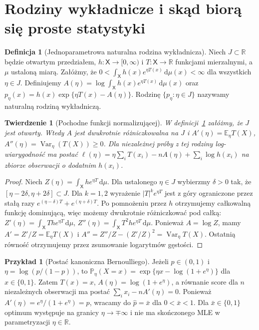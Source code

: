 \documentclass[11pt,a4paper,oneside]{report}
\numberwithin{equation}{chapter}
\theoremstyle{plain}
\newtheorem{twierdzenie}{Twierdzenie}[chapter]
\theoremstyle{definition}
\newtheorem{definicja}{Definicja}[chapter]
\newtheorem{przyklad}{Przykład}[chapter]
\theoremstyle{remark}
\newcommand{\R}{\mathbb R}
\newcommand{\Prob}{\mathbb P}
\newcommand{\E}{\mathbb E}
\newcommand{\Var}{\operatorname{Var}}
\newcommand{\dd}{\mathrm d}
\begin{document}
\section{Rodziny wykładnicze i skąd biorą się proste statystyki}
\begin{definicja}[Jednoparametrowa naturalna rodzina wykładnicza]\label{def:exp-family}
Niech $J\subset\R$ będzie otwartym przedziałem, $h:\mathsf X\to[0,\infty)$
i $T:\mathsf X\to\R$ funkcjami mierzalnymi, a $\mu$ ustaloną miarą.
Załóżmy, że
$0<\int_{\mathsf X}h(x)e^{\eta T(x)}\,\dd\mu(x)<\infty$ dla wszystkich $\eta\in J$.
Definiujemy
$A(\eta)=\log\int_{\mathsf X}h(x)e^{\eta T(x)}\,\dd\mu(x)$ oraz
$p_\eta(x)=h(x)\exp\{\eta T(x)-A(\eta)\}$.
Rodzinę $\{p_\eta:\eta\in J\}$ nazywamy naturalną rodziną wykładniczą.
\end{definicja}

\begin{twierdzenie}[Pochodne funkcji normalizującej]\label{thm:exp-family-moments}
W definicji~\ref{def:exp-family} załóżmy, że $J$ jest otwarty.
Wtedy $A$ jest dwukrotnie różniczkowalna na $J$ i
$A'(\eta)=\E_\eta T(X)$, $A''(\eta)=\Var_\eta(T(X))\ge0$.
Dla niezależnej próby z tej rodziny log-wiarygodność ma postać
$\ell(\eta)=\eta\sum_iT(x_i)-nA(\eta)+\sum_i\log h(x_i)$
na zbiorze obserwacji o dodatnim $h(x_i)$.
\end{twierdzenie}
\begin{proof}
Niech $Z(\eta)=\int_{\mathsf X}h e^{\eta T}\,\dd\mu$. Dla ustalonego
$\eta\in J$ wybierzmy $\delta>0$ tak, że
$[\eta-2\delta,\eta+2\delta]\subset J$. Dla $k=1,2$ wyrażenie
$|T|^k e^{\eta T}$ jest z góry ograniczone przez stałą razy
$e^{(\eta-\delta)T}+e^{(\eta+\delta)T}$.
Po pomnożeniu przez $h$ otrzymujemy całkowalną funkcję dominującą,
więc możemy dwukrotnie różniczkować pod całką:
$Z'(\eta)=\int_{\mathsf X}T h e^{\eta T}\,\dd\mu$,
$Z''(\eta)=\int_{\mathsf X}T^2 h e^{\eta T}\,\dd\mu$.
Ponieważ $A=\log Z$, mamy $A'=Z'/Z=\E_\eta T(X)$ i
$A''=Z''/Z-(Z'/Z)^2=\Var_\eta T(X)$.
Ostatnią równość otrzymujemy przez zsumowanie logarytmów gęstości.
\end{proof}

\begin{przyklad}[Postać kanoniczna Bernoulliego]
Jeżeli $p\in(0,1)$ i $\eta=\log(p/(1-p))$, to
$\Prob_\eta(X=x)=\exp\{\eta x-\log(1+e^\eta)\}$ dla $x\in\{0,1\}$.
Zatem $T(x)=x$, $A(\eta)=\log(1+e^\eta)$, a równanie score dla
$n$ niezależnych obserwacji ma postać
$\sum_i x_i-nA'(\eta)=0$. Ponieważ
$A'(\eta)=e^\eta/(1+e^\eta)=p$, wracamy do
$\widehat p=\bar x$ dla $0<\bar x<1$.
Dla $\bar x\in\{0,1\}$ optimum występuje na granicy
$\eta\to\mp\infty$ i nie ma skończonego MLE w parametryzacji $\eta\in\R$.
\end{przyklad}
\end{document}
